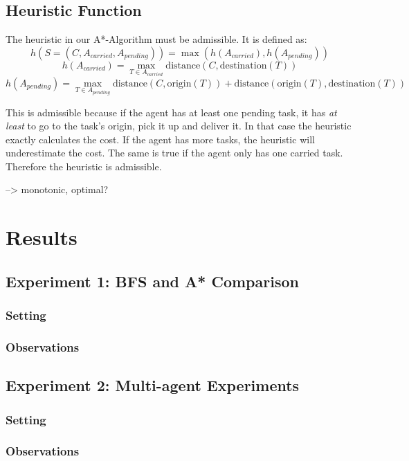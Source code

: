 \documentclass[11pt]{article}
\begin{document}
\subsection{Heuristic Function}
The heuristic in our A*-Algorithm must be admissible. It is defined as:
$$
h(S = (C, A_{carried}, A_{pending})) = \max (h(A_{carried}), h(A_{pending})) 
$$$$
h(A_{carried}) = \max_{T \in A_{carried}} \text{distance}(C, \text{destination}(T))
$$$$
h(A_{pending}) = \max_{T \in A_{pending}} \text{distance}(C, \text{origin}(T)) + 
\text{distance}(\text{origin}(T), \text{destination}(T))
$$

This is admissible because if the agent has at least one pending task, it has \textit{at least}
to go to the task's origin, pick it up and deliver it. In that case the heuristic exactly 
calculates the cost. If the agent has more tasks, the heuristic will underestimate the cost. 
The same is true if the agent only has one carried task. Therefore the heuristic 
is admissible.

--> monotonic, optimal?


\section{Results}

\subsection{Experiment 1: BFS and A* Comparison}

\subsubsection{Setting}

\subsubsection{Observations}


\subsection{Experiment 2: Multi-agent Experiments}

\subsubsection{Setting}

\subsubsection{Observations}
\end{document}
